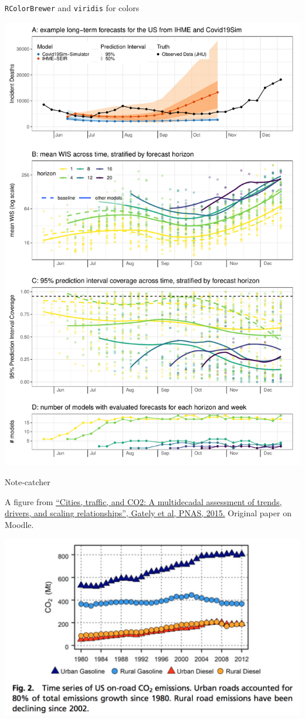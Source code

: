 \documentclass[table]{beamer}\usepackage[]{graphicx}\usepackage[]{color}
\begin{document}
\begin{frame}[fragile]{{\tt RColorBrewer} and {\tt viridis} for colors}

\includegraphics[width=.5\textwidth]{figure-static/fig-by-horizon-week}

\end{frame}




\begin{frame}[fragile]{Note-catcher}


A figure from \href{http://www.pnas.org/content/112/16/4999.full.pdf}{``Cities, traffic, and CO2: A multidecadal assessment of trends, drivers, and scaling relationships'', Gately et al, PNAS, 2015.} Original paper on Moodle.

\includegraphics[width=\textwidth]{figure-static/pollution.png}

\end{frame}
\end{document}
